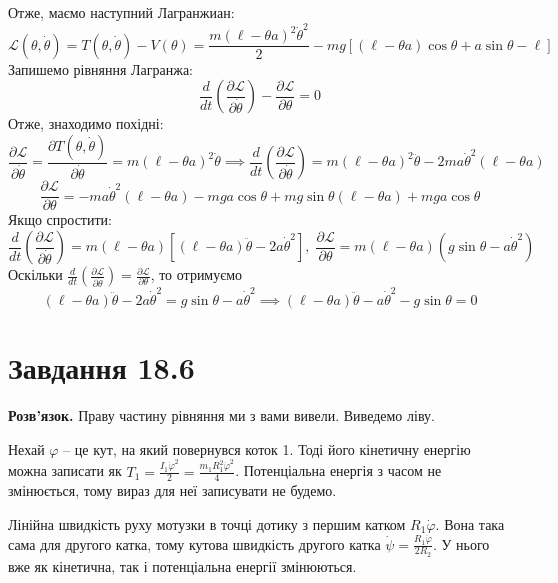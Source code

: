 \documentclass[14pt]{extarticle}
\begin{document}
Отже, маємо наступний Лагранжиан:
\[
\mathcal{L}(\theta,\dot{\theta}) = T(\theta,\dot{\theta}) - V(\theta) = \frac{m(\ell-\theta a)^2\dot{\theta}^2}{2} - mg\left[(\ell-\theta a)\cos\theta + a\sin\theta - \ell\right]
\]
Запишемо рівняння Лагранжа:
\[
\frac{d}{dt}\left(\frac{\partial\mathcal{L}}{\partial\dot{\theta}}\right) - \frac{\partial \mathcal{L}}{\partial\theta} = 0
\]
Отже, знаходимо похідні:
\[
\frac{\partial\mathcal{L}}{\partial\dot{\theta}} = \frac{\partial T(\theta,\dot{\theta})}{\partial \dot{\theta}} = m(\ell-\theta a)^2\dot{\theta} \implies \frac{d}{dt}\left(\frac{\partial\mathcal{L}}{\partial\dot{\theta}}\right) = m(\ell-\theta a)^2\ddot{\theta}-2ma\dot{\theta}^2(\ell-\theta a)
\]
\[
\frac{\partial \mathcal{L}}{\partial\theta} = -ma\dot{\theta}^2(\ell-\theta a) - mga\cos\theta + mg\sin\theta(\ell-\theta a) + mga\cos\theta
\]
Якщо спростити:
\[
\frac{d}{dt}\left(\frac{\partial\mathcal{L}}{\partial\dot{\theta}}\right) = m(\ell-\theta a)\left[(\ell-\theta a)\ddot{\theta}-2a\dot{\theta}^2\right], \; \frac{\partial\mathcal{L}}{\partial\theta} = m(\ell-\theta a)(g\sin\theta - a\dot{\theta}^2)
\]
Оскільки $\frac{d}{dt}\left(\frac{\partial\mathcal{L}}{\partial\dot{\theta}}\right)=\frac{\partial\mathcal{L}}{\partial\theta}$, то отримуємо
\[
(\ell-\theta a)\ddot{\theta} - 2a\dot{\theta}^2 = g\sin\theta - a\dot{\theta}^2 \implies \boxed{(\ell-\theta a)\ddot{\theta} - a\dot{\theta}^2 - g\sin\theta = 0}
\]

\pagebreak
\section*{Завдання 18.6}

\textbf{Розв'язок.} Праву частину рівняння ми з вами вивели. Виведемо ліву.

Нехай $\varphi$ -- це кут, на який повернувся коток 1. Тоді його кінетичну енергію можна записати як $T_1=\frac{I_1\dot{\varphi}^2}{2} = \frac{m_1R_1^2\dot{\varphi}^2}{4}$. Потенціальна енергія з часом не змінюється, тому вираз для неї записувати не будемо.

Лінійна швидкість руху мотузки в точці дотику з першим катком $R_1\dot{\varphi}$. Вона така сама для другого катка, тому кутова швидкість другого катка $\dot{\psi} = \frac{R_1\dot{\varphi}}{2R_2}$. У нього вже як кінетична, так і потенціальна енергії змінюються. 
\end{document}
